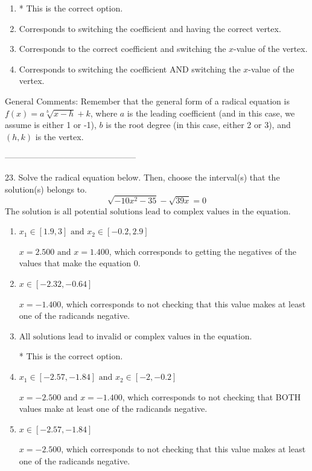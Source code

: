 \documentclass{extbook}[14pt]
\begin{document}
\begin{enumerate}[label=\Alph*.] 
\item * This is the correct option.  
\item Corresponds to switching the coefficient and having the correct vertex.  
\item Corresponds to the correct coefficient and switching the $x$-value of the vertex.  
\item Corresponds to switching the coefficient AND switching the $x$-value of the vertex.  
\end{enumerate} 
 
General Comments: Remember that the general form of a radical equation is $ f(x) = a \sqrt[b]{x - h} + k $, where $a$ is the leading coefficient (and in this case, we assume is either 1 or -1), $b$ is the root degree (in this case, either 2 or 3), and $(h, k)$ is the vertex.

-----------------------------------------------

23. Solve the radical equation below. Then, choose the interval(s) that the solution(s) belongs to.
\[ \sqrt{-10 x^2 - 35} - \sqrt{39 x} = 0 \] 
The solution is $ \text{all potential solutions lead to complex values in the equation.} $ 

\begin{enumerate}[label=\Alph*.] 
\item $ x_1 \in [1.9, 3] \text{ and } x_2 \in [-0.2,2.9] $ 

 $x = 2.500 \text{ and } x = 1.400$, which corresponds to getting the negatives of the values that make the equation 0. 
\item $ x \in [-2.32,-0.64] $ 

 $x = -1.400$, which corresponds to not checking that this value makes at least one of the radicands negative. 
\item $ \text{All solutions lead to invalid or complex values in the equation.} $ 

 * This is the correct option. 
\item $ x_1 \in [-2.57, -1.84] \text{ and } x_2 \in [-2,-0.2] $ 

 $x = -2.500 \text{ and } x = -1.400$, which corresponds to not checking that BOTH values make at least one of the radicands negative. 
\item $ x \in [-2.57,-1.84] $ 

 $x = -2.500$, which corresponds to not checking that this value makes at least one of the radicands negative. 
\end{enumerate} 
 
\end{document}
